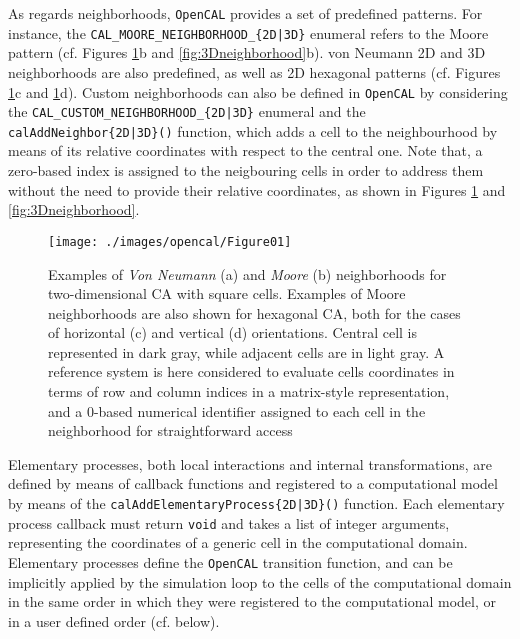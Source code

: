  As regards neighborhoods, \texttt{OpenCAL} provides a set of predefined
patterns. For instance, the \verb'CAL_MOORE_NEIGHBORHOOD_{2D|3D}'
enumeral refers to the Moore pattern (cf. Figures
\ref{fig:2Dneighborhood}b and \ref{fig:3Dneighborhood}b). von
Neumann 2D and 3D neighborhoods are also predefined, as well as 2D
hexagonal patterns (cf. Figures \ref{fig:2Dneighborhood}c and
\ref{fig:2Dneighborhood}d). Custom neighborhoods can also be defined
in \texttt{OpenCAL} by considering the \verb'CAL_CUSTOM_NEIGHBORHOOD_{2D|3D}'
enumeral and the \verb'calAddNeighbor{2D|3D}()' function, which adds
a cell to the neighbourhood by means of its relative coordinates
with respect to the central one. Note that, a zero-based index is
assigned to the neigbouring cells in order to address them without
the need to provide their relative coordinates, as shown in Figures
\ref{fig:2Dneighborhood} and \ref{fig:3Dneighborhood}.
\begin{figure}[!htbp]
	\begin{center}
		\texttt{[image: ./images/opencal/Figure01]}
		\caption[Examples of \textit{Von Neumann} and \textit{Moore} neighborhoods.]{Examples of \textit{Von Neumann} (a) and \textit{Moore} (b) neighborhoods for two-dimensional CA with square cells. Examples of Moore neighborhoods are also shown for hexagonal CA, both for the cases of horizontal (c) and vertical (d) orientations. Central cell is represented in dark gray, while adjacent cells are in light gray. A reference system is here considered to evaluate cells coordinates in terms of row and column indices in a matrix-style representation, and a 0-based numerical identifier assigned to each cell in the neighborhood for straightforward access}
		\label{fig:2Dneighborhood}
	\end{center}
\end{figure}
Elementary processes, both local interactions and internal
transformations, are defined by means of callback functions and
registered to a computational model by means of the
\verb'calAddElementaryProcess{2D|3D}()' function. Each elementary
process callback must return \verb'void' and takes a list of integer
arguments, representing the coordinates of a generic cell in the
computational domain. Elementary processes define the \texttt{OpenCAL}
transition function, and can be implicitly applied by the simulation
loop to the cells of the computational domain in the same order in
which they were registered to the computational model, or in a user
defined order (cf. below).


